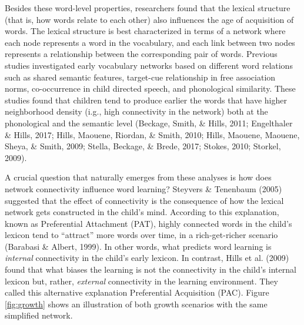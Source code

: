 \documentclass[10pt, letterpaper]{article}
\begin{document}
Besides these word-level properties, researchers found that the lexical
structure (that is, how words relate to each other) also influences the
age of acquisition of words. The lexical structure is best characterized
in terms of a network where each node represents a word in the
vocabulary, and each link between two nodes represents a relationship
between the corresponding pair of words. Previous studies investigated
early vocabulary networks based on different word relations such as
shared semantic features, target-cue relationship in free association
norms, co-occurrence in child directed speech, and phonological
similarity. These studies found that children tend to produce earlier
the words that have higher neighborhood density (i.g., high connectivity
in the network) both at the phonological and the semantic level
(Beckage, Smith, \& Hills, 2011; Engelthaler \& Hills, 2017; Hills,
Maouene, Riordan, \& Smith, 2010; Hills, Maouene, Maouene, Sheya, \&
Smith, 2009; Stella, Beckage, \& Brede, 2017; Stokes, 2010; Storkel,
2009).

A crucial question that naturally emerges from these analyses is how
does network connectivity influence word learning? Steyvers \& Tenenbaum
(2005) suggested that the effect of connectivity is the consequence of
how the lexical network gets constructed in the child's mind. According
to this explanation, known as Preferential Attachment (PAT), highly
connected words in the child's lexicon tend to ``attract'' more words
over time, in a rich-get-richer scenario (Barabasi \& Albert, 1999). In
other words, what predicts word learning is \emph{internal} connectivity
in the child's early lexicon. In contrast, Hills et al. (2009) found
that what biases the learning is not the connectivity in the child's
internal lexicon but, rather, \emph{external} connectivity in the
learning environment. They called this alternative explanation
Preferential Acquisition (PAC). Figure \ref{fig:growth} shows an
illustration of both growth scenarios with the same simplified network.
\end{document}
